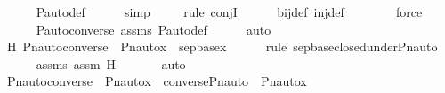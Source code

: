 \begin{isabellebody}
\ \ \ \ \isamarkupfalse%
\ P{\isacharunderscore}{\kern0pt}auto{\isacharunderscore}{\kern0pt}def\isanewline
\ \ \ \ \isamarkupfalse%
\ simp\isanewline
\ \ \ \ \isamarkupfalse%
{\isacharparenleft}{\kern0pt}rule\ conjI{\isacharparenright}{\kern0pt}\isanewline
\ \ \ \ \isamarkupfalse%
\ bij{\isacharunderscore}{\kern0pt}def\ inj{\isacharunderscore}{\kern0pt}def\ \isanewline
\ \ \ \ \ \isamarkupfalse%
\ force\isanewline
\ \ \ \ \isamarkupfalse%
\ P{\isacharunderscore}{\kern0pt}auto{\isacharunderscore}{\kern0pt}converse\ assms\ P{\isacharunderscore}{\kern0pt}auto{\isacharunderscore}{\kern0pt}def\isanewline
\ \ \ \ \isamarkupfalse%
\ auto\ \isanewline
\ \ \isamarkupfalse%
\ H{}{\isacharcolon}{\kern0pt}\ {\isachardoublequoteopen}Pn{\isacharunderscore}{\kern0pt}auto{\isacharparenleft}{\kern0pt}converse{\isacharparenleft}{\kern0pt}{\isasympi}{\isacharparenright}{\kern0pt}{\isacharparenright}{\kern0pt}\ {\isacharbackquote}{\kern0pt}\ {\isacharparenleft}{\kern0pt}Pn{\isacharunderscore}{\kern0pt}auto{\isacharparenleft}{\kern0pt}{\isasympi}{\isacharparenright}{\kern0pt}{\isacharbackquote}{\kern0pt}x{\isacharparenright}{\kern0pt}\ {\isasymin}\ sep{\isacharunderscore}{\kern0pt}base{\isacharparenleft}{\kern0pt}x{}{\isacharparenright}{\kern0pt}{\isachardoublequoteclose}\ \isanewline
\ \ \ \ \isamarkupfalse%
{\isacharparenleft}{\kern0pt}rule\ sep{\isacharunderscore}{\kern0pt}base{\isacharunderscore}{\kern0pt}closed{\isacharunderscore}{\kern0pt}under{\isacharunderscore}{\kern0pt}Pn{\isacharunderscore}{\kern0pt}auto{\isacharparenright}{\kern0pt}\isanewline
\ \ \ \ \isamarkupfalse%
\ assms\ assm{}\ H\ \isanewline
\ \ \ \ \isamarkupfalse%
\ auto\ \isanewline
\ \ \isanewline
\ \ \isamarkupfalse%
\ {\isachardoublequoteopen}Pn{\isacharunderscore}{\kern0pt}auto{\isacharparenleft}{\kern0pt}converse{\isacharparenleft}{\kern0pt}{\isasympi}{\isacharparenright}{\kern0pt}{\isacharparenright}{\kern0pt}\ {\isacharbackquote}{\kern0pt}\ {\isacharparenleft}{\kern0pt}Pn{\isacharunderscore}{\kern0pt}auto{\isacharparenleft}{\kern0pt}{\isasympi}{\isacharparenright}{\kern0pt}{\isacharbackquote}{\kern0pt}x{\isacharparenright}{\kern0pt}\ {\isacharequal}{\kern0pt}\ converse{\isacharparenleft}{\kern0pt}Pn{\isacharunderscore}{\kern0pt}auto{\isacharparenleft}{\kern0pt}{\isasympi}{\isacharparenright}{\kern0pt}{\isacharparenright}{\kern0pt}\ {\isacharbackquote}{\kern0pt}\ {\isacharparenleft}{\kern0pt}Pn{\isacharunderscore}{\kern0pt}auto{\isacharparenleft}{\kern0pt}{\isasympi}{\isacharparenright}{\kern0pt}{\isacharbackquote}{\kern0pt}x{\isacharparenright}{\kern0pt}{\isachardoublequoteclose}\ \isanewline

\end{isabellebody}
